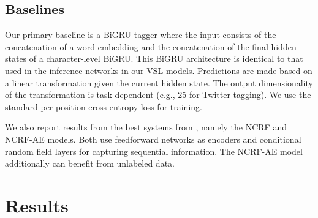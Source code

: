 \documentclass[11pt,a4paper]{article}
\begin{document}
\subsection{Baselines}
\label{baseline}
Our primary baseline is a BiGRU tagger where the input consists of the concatenation of a word embedding and the concatenation of the final hidden states of a character-level BiGRU. This BiGRU architecture is identical to that used in the inference networks in our VSL models.
Predictions are made based on a linear transformation given the current hidden state. The output dimensionality of the transformation is task-dependent (e.g., 25 for Twitter tagging). We use the standard per-position cross entropy loss for training.

We also report results from the best systems from \citet{zhang2017semi}, namely the NCRF and NCRF-AE models. Both use feedforward networks as encoders and conditional random field layers for capturing sequential information. The NCRF-AE model additionally can benefit from unlabeled data.


\section{Results}
\end{document}
